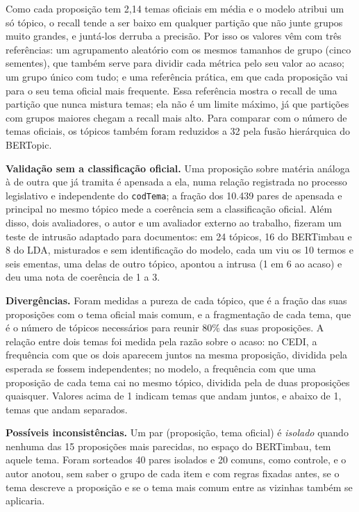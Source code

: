 \documentclass[12pt]{article}
\begin{document}
Como cada proposição tem 2,14 temas oficiais em média e o modelo atribui um só tópico, o recall tende a ser baixo em qualquer partição que não junte grupos muito grandes, e juntá-los derruba a precisão. Por isso os valores vêm com três referências: um agrupamento aleatório com os mesmos tamanhos de grupo (cinco sementes), que também serve para dividir cada métrica pelo seu valor ao acaso; um grupo único com tudo; e uma referência prática, em que cada proposição vai para o seu tema oficial mais frequente. Essa referência mostra o recall de uma partição que nunca mistura temas; ela não é um limite máximo, já que partições com grupos maiores chegam a recall mais alto. Para comparar com o número de temas oficiais, os tópicos também foram reduzidos a 32 pela fusão hierárquica do BERTopic.

\textbf{Validação sem a classificação oficial.} Uma proposição sobre matéria análoga à de outra que já tramita é apensada a ela, numa relação registrada no processo legislativo e independente do \texttt{codTema}; a fração dos 10.439 pares de apensada e principal no mesmo tópico mede a coerência sem a classificação oficial. Além disso, dois avaliadores, o autor e um avaliador externo ao trabalho, fizeram um teste de intrusão \citep{chang2009reading} adaptado para documentos: em 24 tópicos, 16 do BERTimbau e 8 do LDA, misturados e sem identificação do modelo, cada um viu os 10 termos e seis ementas, uma delas de outro tópico, apontou a intrusa (1 em 6 ao acaso) e deu uma nota de coerência de 1 a 3.

\textbf{Divergências.} Foram medidas a pureza de cada tópico, que é a fração das suas proposições com o tema oficial mais comum, e a fragmentação de cada tema, que é o número de tópicos necessários para reunir 80\% das suas proposições. A relação entre dois temas foi medida pela razão sobre o acaso: no CEDI, a frequência com que os dois aparecem juntos na mesma proposição, dividida pela esperada se fossem independentes; no modelo, a frequência com que uma proposição de cada tema cai no mesmo tópico, dividida pela de duas proposições quaisquer. Valores acima de 1 indicam temas que andam juntos, e abaixo de 1, temas que andam separados.

\textbf{Possíveis inconsistências.} Um par (proposição, tema oficial) é \textit{isolado} quando nenhuma das 15 proposições mais parecidas, no espaço do BERTimbau, tem aquele tema. Foram sorteados 40 pares isolados e 20 comuns, como controle, e o autor anotou, sem saber o grupo de cada item e com regras fixadas antes, se o tema descreve a proposição e se o tema mais comum entre as vizinhas também se aplicaria.
\end{document}
